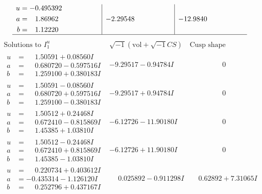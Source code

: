 \documentclass[1p]{elsarticle_modified}
\theoremstyle{definition}
\newcommand{\I}{\sqrt{-1}}
\begin{document}
$$\begin{array}{c|c|c}
\begin{aligned}
u &= -0.495392\phantom{ +0.000000I} \\
a &= \phantom{-}1.86962\phantom{ +0.000000I} \\
b &= \phantom{-}1.12220\phantom{ +0.000000I}\end{aligned}
 & -2.29548\phantom{ +0.000000I} & -12.9840\phantom{ +0.000000I}\\
 \hline 
 \end{array}$$\newpage$$\begin{array}{c|c|c}  
\text{Solutions to }I^u_{1}& \I (\text{vol} + \sqrt{-1}CS) & \text{Cusp shape}\\
 \hline 
\begin{aligned}
u &= \phantom{-}1.50591 + 0.08560 I \\
a &= \phantom{-}0.680720 - 0.597516 I \\
b &= \phantom{-}1.259100 + 0.380183 I\end{aligned}
 & -9.29517 - 0.94784 I & \phantom{-0.000000 } 0 \\ \hline\begin{aligned}
u &= \phantom{-}1.50591 - 0.08560 I \\
a &= \phantom{-}0.680720 + 0.597516 I \\
b &= \phantom{-}1.259100 - 0.380183 I\end{aligned}
 & -9.29517 + 0.94784 I & \phantom{-0.000000 } 0 \\ \hline\begin{aligned}
u &= \phantom{-}1.50512 + 0.24468 I \\
a &= \phantom{-}0.672410 - 0.815869 I \\
b &= \phantom{-}1.45385 + 1.03810 I\end{aligned}
 & -6.12726 - 11.90180 I & \phantom{-0.000000 } 0 \\ \hline\begin{aligned}
u &= \phantom{-}1.50512 - 0.24468 I \\
a &= \phantom{-}0.672410 + 0.815869 I \\
b &= \phantom{-}1.45385 - 1.03810 I\end{aligned}
 & -6.12726 + 11.90180 I & \phantom{-0.000000 } 0 \\ \hline\begin{aligned}
u &= \phantom{-}0.220734 + 0.403612 I \\
a &= -0.435314 - 1.126120 I \\
b &= \phantom{-}0.252796 + 0.437167 I\end{aligned}
 & \phantom{-}0.025892 - 0.911298 I & \phantom{-}0.62892 + 7.31065 I \\ \hline\begin{aligned}

\end{aligned}
\end{array}$$
\end{document}
